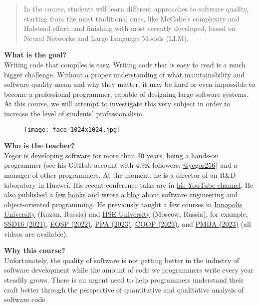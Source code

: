 \documentclass[nobrand,anonymous,nodate,nosecurity]{huawei}
\begin{document}
\else

{

\begin{abstract}
In the course, students will learn different approaches to software quality,
starting from the most traditional ones, like McCabe's complexity and
Halstead effort, and finishing with most recently developed, based on Neural Networks
and Large Language Models (LLM).
\end{abstract}

\textbf{What is the goal?}\\
Writing code that compiles is easy. Writing code that is easy to read
is a much bigger challenge. Without a proper understanding of what maintainability
and software quality mean and why they matter, it may be hard or even impossible
to become a professional programmer, capable of designing large software systems.
At this course, we will attempt to investigate this very subject
in order to increase the level of students' professionalism.

\begin{wrapfigure}{r}{1.2in}%
\raggedleft%
\texttt{[image: face-1024x1024.jpg]}%
\end{wrapfigure}
\textbf{Who is the teacher?}\\
Yegor is developing software for more than 30 years, being a hands-on programmer
(see his GitHub account with 4.9K followers: \href{https://github.com/yegor256}{@yegor256})
and a manager of other programmers. At the moment, he is a director
of an R\&D laboratory in Huawei. His recent conference talks are in
\href{https://www.youtube.com/channel/UCr9qCdqXLm2SU0BIs6d_68Q}{his YouTube channel}.
He also published a \href{https://www.yegor256.com/books.html}{few books}
and wrote a \href{https://www.yegor256.com/contents.html}{blog} about software engineering
and object-oriented programming.
He previously taught a few courses in
\href{https://innopolis.university/}{Innopolis University} (Kazan, Russia)
and
\href{https://hse.ru}{HSE University} (Moscow, Russia),
for example,
\href{https://github.com/yegor256/ssd16}{SSD16 (2021)},
\href{https://github.com/yegor256/eqsp}{EQSP (2022)},
\href{https://github.com/yegor256/ppa}{PPA (2023)},
\href{https://github.com/yegor256/painofoop}{COOP (2023)},
and
\href{https://github.com/yegor256/pmba}{PMBA (2023)}
(all videos are available).

\textbf{Why this course?}\\
Unfortunately, the quality of software is not getting better in the
industry of software development while the amount of code we programmers
write every year steadily grows. There is an urgent need to help
programmers understand their craft better through the perspective
of quantitative and qualitative analysis of software code.

}
\end{document}
